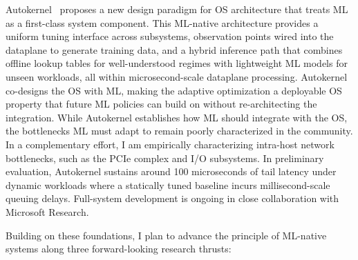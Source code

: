 \documentclass[11pt,letterpaper]{article}
\begin{document}
Autokernel~\cite{autokernel} proposes a new design paradigm for OS architecture that treats ML as a first-class system component.
This ML-native architecture provides a uniform tuning interface across subsystems, observation points wired into the dataplane to generate training data, and a hybrid inference path that combines offline lookup tables for well-understood regimes with lightweight ML models for unseen workloads, all within microsecond-scale dataplane processing.
Autokernel co-designs the OS with ML, making the adaptive optimization a deployable OS property that future ML policies can build on without re-architecting the integration.
While Autokernel establishes how ML should integrate with the OS, the bottlenecks ML must adapt to remain poorly characterized in the community.
In a complementary effort, I am empirically characterizing intra-host network bottlenecks, such as the PCIe complex and I/O subsystems.
In preliminary evaluation, Autokernel sustains around 100 microseconds of tail latency under dynamic workloads where a statically tuned baseline incurs millisecond-scale queuing delays.
Full-system development is ongoing in close collaboration with Microsoft Research. 

Building on these foundations, I plan to advance the principle of ML-native systems along three forward-looking research thrusts:
\end{document}
